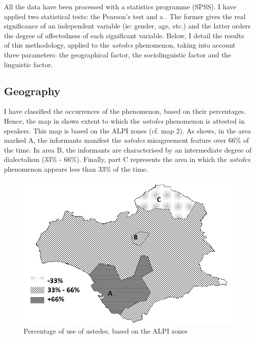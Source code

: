 \documentclass[output=paper]{LSP/langsci}
\begin{document}
All the data have been processed with a statistics programme (SPSS). I have applied two statistical tests: the Pearson’s  test and a . The former gives the real significance of an independent variable (ie: gender, age, etc.) and the latter orders the degree of affectedness of each significant variable. Below, I detail the results of this methodology, applied to the \textit{ustedes} phenomenon, taking into account three parameters: the geographical factor, the sociolinguistic factor and the linguistic factor.

\subsection{Geography}
I have classified the occurrences of the phenomenon, based on their percentages. Hence, the map in  shows extent to which the  \textit{ustedes} phenomenon is attested in speakers. This map is based on the ALPI zones (cf. map 2). As  shows, in the area marked A, the informants manifest the \textit{ustedes} misagreement feature over 66\% of the time. In area B, the informants are characterised by an intermediate degree of dialectalism (33\% - 66\%). Finally, part C represents the area in which the \textit{ustedes} phenomenon appears less than 33\% of the time.

\begin{figure}
\includegraphics[width=\textwidth]{illustrations/lara_fig3}
\caption{Percentage of use of ustedes, based on the ALPI zones}
\label{fig:lara:3}
\end{figure}
\end{document}
